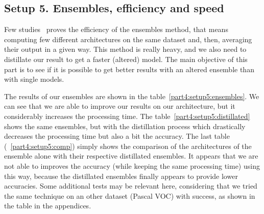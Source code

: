 \subsection*{Setup 5. Ensembles, efficiency and speed}
Few studies~\cite{MARM16}  proves the efficiency of the ensembles method, that means computing few different architectures on the same dataset and, then, averaging their output in a given way. This method is really heavy, and we also need to distillate our result to get a faster (altered) model. The main objective of this part is to see if it is possible to get better results with an altered ensemble than with single models.

The results of our ensembles are shown in the table~\ref{part4:setup5:ensembles}. We can see that we are able to improve our results on our architecture, but it considerably increases the processing time. The table~\ref{part4:setup5:distillated} shows the same ensembles, but with the distillation process which drastically decreases the processing time but also a bit the accuracy. The last table (~\ref{part4:setup5:comp}) simply shows the comparison of the architectures of the ensemble alone with their respective distillated ensembles. It appears that we are not able to improves the accuracy (while keeping the same processing time) using this way, because the distillated ensembles finally appears to provide lower accuracies. Some additional tests may be relevant here, considering that we tried the same technique on an other dataset (Pascal VOC) with success, as shown in the table  in the appendices.

